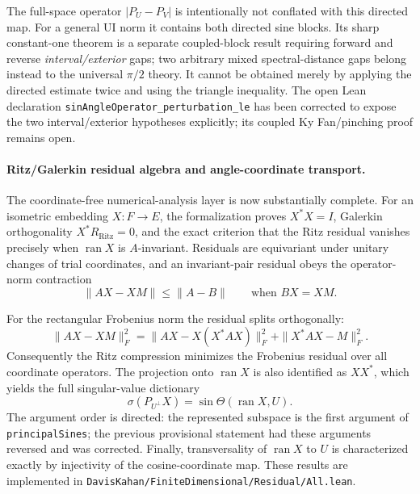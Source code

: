\documentclass[11pt]{article}
\theoremstyle{remark}
\begin{document}
The full-space operator $|P_U-P_V|$ is intentionally not conflated with this
directed map.  For a general UI norm it contains both directed sine blocks.
Its sharp constant-one theorem is a separate coupled-block result requiring
forward and reverse \emph{interval/exterior} gaps; two arbitrary mixed
spectral-distance gaps belong instead to the universal $\pi/2$ theory.  It
cannot be obtained merely by applying the directed estimate twice and using
the triangle inequality.  The open Lean declaration
\texttt{sinAngleOperator\_perturbation\_le} has been corrected to expose the
two interval/exterior hypotheses explicitly; its coupled Ky Fan/pinching proof
remains open.

\paragraph{Ritz/Galerkin residual algebra and angle-coordinate transport.}
The coordinate-free numerical-analysis layer is now substantially complete.
For an isometric embedding $X:F\to E$, the formalization proves
$X^*X=I$, Galerkin orthogonality $X^*R_{\mathrm{Ritz}}=0$, and the exact
criterion that the Ritz residual vanishes precisely when $\operatorname{ran}X$
is $A$-invariant.  Residuals are equivariant under unitary changes of trial
coordinates, and an invariant-pair residual obeys the operator-norm contraction
\[
  \|AX-XM\| \le \|A-B\|
  \qquad\text{when }BX=XM.
\]

For the rectangular Frobenius norm the residual splits orthogonally:
\[
  \|AX-XM\|_F^2
  = \|AX-X(X^*AX)\|_F^2 + \|X^*AX-M\|_F^2.
\]
Consequently the Ritz compression minimizes the Frobenius residual over all
coordinate operators.  The projection onto $\operatorname{ran}X$ is also
identified as $XX^*$, which yields the full singular-value dictionary
\[
  \sigma(P_{U^\perp}X)
  = \sin\Theta(\operatorname{ran}X,U).
\]
The argument order is directed: the represented subspace is the first argument
of \texttt{principalSines}; the previous provisional statement had these
arguments reversed and was corrected.  Finally, transversality of
$\operatorname{ran}X$ to $U$ is characterized exactly by injectivity of the
cosine-coordinate map.  These results are implemented in
\texttt{DavisKahan/FiniteDimensional/Residual/All.lean}.
\end{document}
